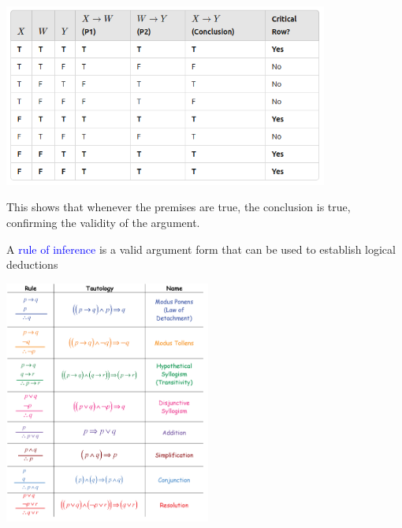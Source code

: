\documentclass[aspectratio=169]{beamer}
\providecommand{\Blue}[1]{\textcolor{blue}{#1}}
\begin{document}
 \begin{frame}[plain]{}
 
  \begin{center}
       \includegraphics[height=6cm]{./img/lecture16-fig3.png}
     \end{center}
     
   This shows that whenever the premises are true, the conclusion is true, 
   confirming the validity of the argument.
 
\end{frame}


 \begin{frame}[plain]{}
  
  A \Blue{rule of inference} is a valid argument form that can be used
   to establish logical deductions
   
   \begin{center}
       \includegraphics[height=8cm]{./img/lecture16-fig4.png}
     \end{center}
   
 \end{frame}
\end{document}

